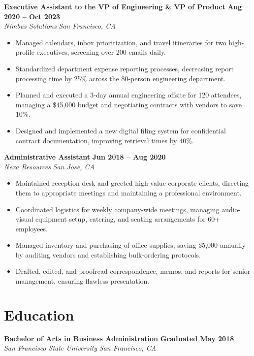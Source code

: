\documentclass[10pt]{article}
\begin{document}
\noindent
\textbf{Executive Assistant to the VP of Engineering \& VP of Product} \hfill \textbf{Aug 2020 -- Oct 2023} \\
\textit{Nimbus Solutions} \hfill \textit{San Francisco, CA}
\begin{itemize}
  \item Managed calendars, inbox prioritization, and travel itineraries for two high-profile executives, screening over 200 emails daily.
  \item Standardized department expense reporting processes, decreasing report processing time by 25\% across the 80-person engineering department.
  \item Planned and executed a 3-day annual engineering offsite for 120 attendees, managing a \$45,000 budget and negotiating contracts with vendors to save 10\%.
  \item Designed and implemented a new digital filing system for confidential contract documentation, improving retrieval times by 40\%.
\end{itemize}

\vspace{3pt}

\noindent
\textbf{Administrative Assistant} \hfill \textbf{Jun 2018 -- Aug 2020} \\
\textit{Nexa Resources} \hfill \textit{San Jose, CA}
\begin{itemize}
  \item Maintained reception desk and greeted high-value corporate clients, directing them to appropriate meetings and maintaining a professional environment.
  \item Coordinated logistics for weekly company-wide meetings, managing audio-visual equipment setup, catering, and seating arrangements for 60+ employees.
  \item Managed inventory and purchasing of office supplies, saving \$5,000 annually by auditing vendors and establishing bulk-ordering protocols.
  \item Drafted, edited, and proofread correspondence, memos, and reports for senior management, ensuring flawless presentation.
\end{itemize}

\section*{Education}
\noindent
\textbf{Bachelor of Arts in Business Administration} \hfill \textbf{Graduated May 2018} \\
\textit{San Francisco State University} \hfill \textit{San Francisco, CA}
\end{document}
